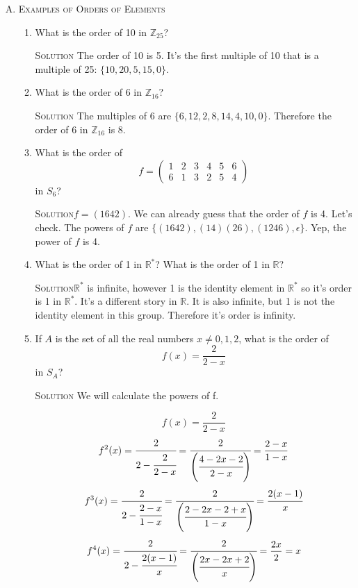\documentclass[twoside]{amsart}
\newcommand{\Reals}{\ensuremath{\mathbb{R}}\xspace}
\newcommand{\Integers}{\ensuremath{\mathbb{Z}{}}\xspace}
\newcommand{\solution}{\textsc{Solution}\xspace}
\newcommand{\eps}{\ensuremath{\epsilon}\xspace}
\newcommand{\blank}{\vspace{5pt}}
\newcommand{\itm}{\blank\item}
\newcommand{\sol}{\blank\noindent\solution}
\begin{document}
\begin{enumerate}[A.]
   \blank
   \item \textsc{Examples of Orders of Elements}

   \begin{enumerate}[1]
      \blank
      \item What is the order of 10 in $\Integers_{25}$?

      \blank \noindent \solution The order of 10 is 5. It's the first
      multiple of 10 that is a multiple of 25: $\{10, 20, 5, 15, 0\}$.

      \blank
      \item What is the order of 6 in $\Integers_{16}$?

      \blank \noindent \solution The multiples of 6 are
      $\{6, 12, 2, 8, 14, 4, 10, 0\}$. Therefore the order of 6
      in $\Integers_{16}$ is 8.

      \blank
      \item What is the order of 
      \[
         f = 
            \begin{pmatrix}
               1 & 2 & 3 & 4 & 5 & 6 \\
               6 & 1 & 3 & 2 & 5 & 4
            \end{pmatrix}
      \]
      in $S_6$?

      \blank \noindent \solution $f = (1642)$. We can already guess
      that the order of $f$ is 4. Let's check. The powers of $f$
      are $\{(1642), (14)(26), (1246), \eps\}$. Yep, the power of $f$
      is 4.

      \blank
      \item What is the order of 1 in $\Reals^*$? What is the order
      of 1 in $\Reals$?

      \sol $\Reals^*$ is infinite, however 1 is the identity element in 
      $\Reals^*$ so it's order is 1 in $\Reals^*$. It's a different 
      story in $\Reals$. It is also infinite, but 1 is not the
      identity element in this group. Therefore it's order is infinity.

      \itm If $A$ is the set of all the real numbers $x \ne 0, 1, 2$,
      what is the order of 
      \[
         f(x) = \frac{2}{2-x}
      \]
      in $S_A$?

      \sol We will calculate the powers of f.

      \[
         f(x) = \frac{2}{2-x}
      \]
      \[
         f^2(x) = \cfrac{2}{2-\cfrac{2}{2-x}} 
                = \cfrac{2}{\left(\cfrac{4-2x-2}{2-x}\right)} 
                = \frac{2-x}{1-x}
      \]
      \[
         f^3(x) = \cfrac{2}{2-\cfrac{2-x}{1-x}}
                = \cfrac{2}{\left(\cfrac{2-2x-2+x}{1-x}\right)}
                = \cfrac{2(x-1)}{x}
      \]
      \[
         f^4(x) = \cfrac{2}{2-\cfrac{2(x-1)}{x}}
                = \cfrac{2}{\left(\cfrac{2x-2x+2}{x}\right)}
                = \frac{2x}{2} = x
      \]


\end{enumerate}
\end{enumerate}
\end{document}
